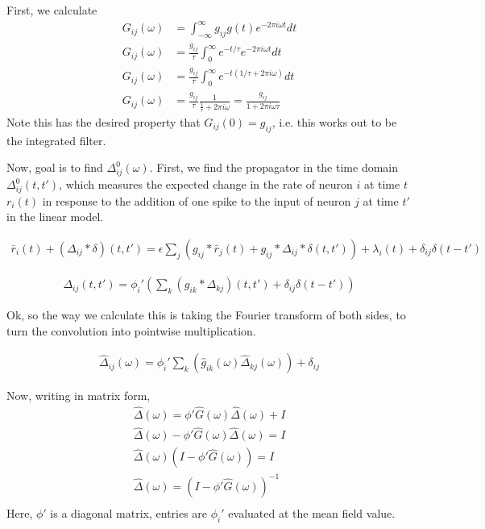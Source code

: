 \documentclass [12pt]{amsart}
\theoremstyle{definition}
\newcommand{\inv}{^{-1}}
\begin{document}
First, we calculate 
\begin{align*}
G_{ij}(\omega) &= \int_{-\infty}^\infty g_{ij}g(t) e^{-2\pi i \omega t} dt \\
G_{ij}(\omega) &= \frac{g_{ij}}{\tau}\int_{0}^\infty e^{-t/\tau}e^{-2\pi i \omega t} dt \\
G_{ij}(\omega) &= \frac{g_{ij}}{\tau}\int_{0}^\infty e^{-t(1/\tau +2\pi i \omega) } dt \\
G_{ij}(\omega) &=   \frac{g_{ij}}{\tau} \frac{1}{\frac 1 \tau + 2\pi i \omega} =  \frac{g_{ij}}{1+ 2\pi i \omega \tau} 
\end{align*}
Note this has the desired property that $G_{ij}(0) = g_{ij}$, i.e. this works out to be the integrated filter. 

Now, goal is to find $\Delta_{ij}^0(\omega)$.  First, we find the propagator in the time domain $\Delta_{ij}^0(t, t')$, which measures the expected change in the rate  of neuron $i$ at time $t$ $r_i(t)$ in response to the addition of one spike to the input of neuron $j$ at time $t'$ in the linear model. 

\begin{align*}
\bar r_i(t)  + (\Delta_{ij} * \delta)(t, t') = \epsilon \sum_{j} \left(g_{ij}* \bar r_j (t) + g_{ij}*\Delta_{ij} *\delta(t,t') \right) + \lambda_i(t) + \delta_{ij}\delta(t-t')
\end{align*}

\begin{align*}
\Delta_{ij}(t,t') = \phi_i'\left(\sum_k (g_{ik} * \Delta_{kj})(t, t') +\delta_{ij} \delta(t -t')\right)
\end{align*}

Ok, so the way we calculate this is taking the Fourier transform of both sides, to turn the convolution into pointwise multiplication. 

\begin{align*}
\hat \Delta_{ij}(\omega) = \phi_i' \sum_{k}\left( \hat g_{ik} (\omega) \hat \Delta_{kj} (\omega)\right) + \delta_{ij}
\end{align*}

Now, writing in matrix form, 
\begin{align*}
\hat \Delta(\omega) = \phi' \hat G (\omega) \hat \Delta (\omega)+ I\\
\hat \Delta(\omega) - \phi' \hat G (\omega) \hat \Delta (\omega) = I\\
\hat \Delta(\omega)(I -   \phi' \hat G (\omega))= I\\
\hat \Delta(\omega)= (I -   \phi' \hat G (\omega))\inv\\
\end{align*}
Here, $\phi'$ is a diagonal matrix, entries are $\phi_i'$ evaluated at the mean field value. 
\end{document}
